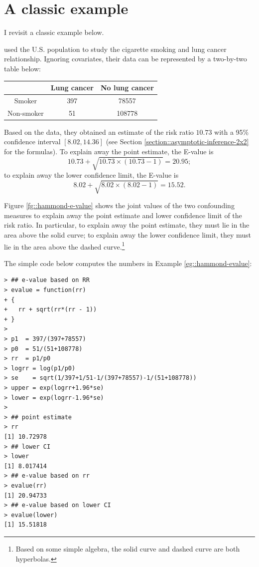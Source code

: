  


\section{A classic example}
\label{sec::evalue-example}


I revisit a classic example below. 


\begin{example}\label{eg::hammond-evalue}
\citet{Hammond::1968} used the U.S. population to study the cigarette smoking and lung cancer relationship. Ignoring covariates, their data can be represented by a two-by-two table below:


\begin{center}
\begin{tabular}{ccc}
\hline 
 & Lung cancer & No lung cancer \\
 \hline 
 Smoker & 397 & 78557 \\
 Non-smoker & 51 & 108778  \\ 
 \hline 
\end{tabular}
\end{center} 


Based on the data, they obtained an estimate of the risk ratio $10.73$ with a 95\% confidence interval $[8.02, 14.36]$ (see Section \ref{section::asymptotic-inference-2x2} for the formulas). To explain away the point estimate, the E-value is 
$$
10.73 + \sqrt{10.73\times (10.73-1)} = 20.95;
$$
to explain away the lower confidence limit, the E-value is 
$$
8.02 +  \sqrt{8.02\times (8.02 - 1)} = 15.52.
$$

Figure \ref{fg::hammond-e-value} shows the joint values of the two confounding measures to explain away the point estimate and lower confidence limit of the risk ratio. In particular, to explain away the point estimate, they must lie in the area above the solid curve; to explain away the lower confidence limit, they must lie in the area above the dashed curve.\footnote{Based on some simple algebra, the solid curve and dashed curve are both hyperbolas.} 
\end{example}


The simple  code below  computes the numbers in Example \ref{eg::hammond-evalue}:
 \begin{lstlisting}
> ## e-value based on RR
> evalue = function(rr)
+ {
+   rr + sqrt(rr*(rr - 1))
+ }
> 
> p1  = 397/(397+78557)
> p0  = 51/(51+108778)
> rr  = p1/p0
> logrr = log(p1/p0)
> se    = sqrt(1/397+1/51-1/(397+78557)-1/(51+108778))
> upper = exp(logrr+1.96*se)
> lower = exp(logrr-1.96*se)
> 
> ## point estimate
> rr
[1] 10.72978
> ## lower CI
> lower
[1] 8.017414
> ## e-value based on rr
> evalue(rr)
[1] 20.94733
> ## e-value based on lower CI
> evalue(lower)
[1] 15.51818
 \end{lstlisting}

